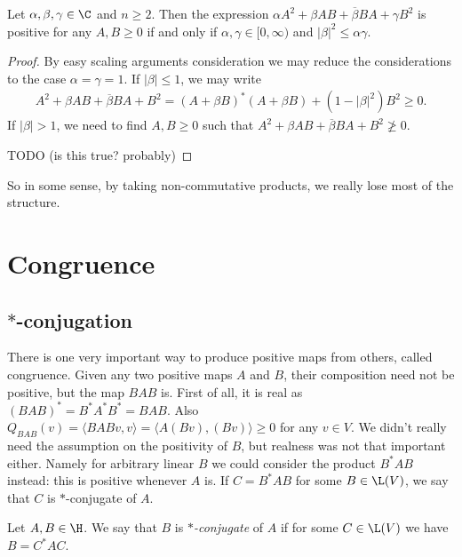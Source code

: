 \begin{prop}\label{symmetric_fail}
	Let $\alpha, \beta, \gamma \in \C$ and $n \geq 2$. Then the expression $\alpha A^{2} + \beta AB + \overline{\beta} BA + \gamma B^{2}$ is positive for any $A, B \geq 0$ if and only if $\alpha, \gamma \in [0, \infty)$ and $|\beta|^{2} \leq \alpha \gamma$.
\end{prop}
\begin{proof}
	By easy scaling arguments consideration we may reduce the considerations to the case $\alpha = \gamma = 1$. If $|\beta| \leq 1$, we may write
	\begin{align*}
		A^2 + \beta A B + \overline{\beta} B A + B^2 = (A + \beta B)^{*}(A + \beta B) + (1 - |\beta|^2) B^2 \geq 0.
	\end{align*}
	If $|\beta| > 1$, we need to find $A, B \geq 0$ such that $A^2 + \beta A B + \overline{\beta} B A + B^2 \not\geq 0$.

	TODO (is this true? probably)
\end{proof}

So in some sense, by taking non-commutative products, we really lose most of the structure.

\section{Congruence}

\subsection{$*$-conjugation}

There is one very important way to produce positive maps from others, called congruence. Given any two positive maps $A$ and $B$, their composition need not be positive, but the map $BAB$ is. First of all, it is real as $(BAB)^{*} = B^{*} A^{*} B^{*} = BAB$. Also $Q_{BAB}(v) = \langle BAB v, v \rangle = \langle A (B v), (B v) \rangle \geq 0$ for any $v \in V$. We didn't really need the assumption on the positivity of $B$, but realness was not that important either. Namely for arbitrary linear $B$ we could consider the product $B^{*}AB$ instead: this is positive whenever $A$ is. If $C = B^{*}AB$ for some $B \in \L(V)$, we say that $C$ is $*$-conjugate of $A$.

\begin{maar}
	Let $A, B \in \H$. We say that $B$ is \textit{$*$-conjugate} of $A$ if for some $C \in \L(V)$ we have $B = C^{*} A C$.
\end{maar}

